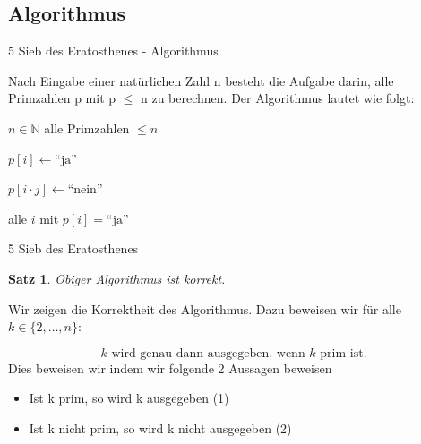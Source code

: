 \documentclass{beamer}
\newtheorem{thm}{Satz}
\begin{document}
\subsection{Algorithmus}
\begin{frame}{5 Sieb des Eratosthenes - Algorithmus}

Nach Eingabe einer natürlichen Zahl n besteht die Aufgabe darin, alle Primzahlen p mit p $\le$ n zu berechnen. Der Algorithmus lautet wie folgt:

\begin{algorithm}[H]
\begin{algorithmic}[1]
\Require $n \in \mathbb{N}$
\Ensure alle Primzahlen $\leq n$

    \State $p[i] \gets \text{``ja''}$
\EndFor

            \State $p[i \cdot j] \gets \text{``nein''}$
        \EndFor
    \EndIf
\EndFor

\State \Return alle $i$ mit $p[i] = \text{``ja''}$
\end{algorithmic}
\end{algorithm}
    
\end{frame}

\begin{frame}[allowframebreaks]{5 Sieb des Eratosthenes}
\begin{thm}
   Obiger Algorithmus ist korrekt.
\end{thm}

Wir zeigen die Korrektheit des Algorithmus. Dazu beweisen wir für alle 
\( k \in \{2, \dots, n\} \):

\textbf{\[
k \text{ wird genau dann ausgegeben, wenn } k \text{ prim ist.}
\]}
Dies beweisen wir indem wir folgende 2 Aussagen beweisen

\begin{itemize}
    \item Ist k prim, so wird k ausgegeben (1)
    \item Ist k nicht prim, so wird k nicht ausgegeben (2)
\end{itemize}
\medskip
\end{frame}
\end{document}
